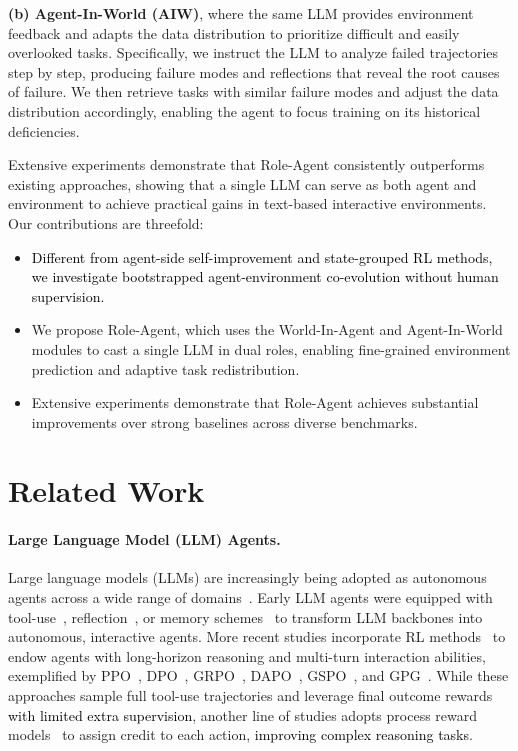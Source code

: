 \documentclass[11pt]{article}
\begin{document}
\textbf{(b) Agent-In-World (AIW)}, where the same LLM provides environment feedback and adapts the data distribution to prioritize difficult and easily overlooked tasks. Specifically, we instruct the LLM to analyze failed trajectories step by step, producing failure modes and reflections that reveal the root causes of failure. We then retrieve tasks with similar failure modes and adjust the data distribution accordingly, enabling the agent to focus training on its historical deficiencies.


Extensive experiments demonstrate that Role-Agent consistently outperforms existing approaches, showing that a single LLM can serve as both agent and environment to achieve practical gains in text-based interactive environments. Our contributions are threefold:

\begin{itemize}
    \item \textcolor{black}{Different from agent-side self-improvement and state-grouped RL methods, we investigate bootstrapped agent-environment co-evolution without human supervision.}
    \vspace{-0.1cm}
    \item We propose Role-Agent, which uses the World-In-Agent and Agent-In-World modules to cast a single LLM in dual roles, enabling fine-grained environment prediction and adaptive task redistribution.
    \vspace{-0.1cm} 
    \item Extensive experiments demonstrate that Role-Agent achieves substantial improvements over strong baselines across diverse benchmarks.
\end{itemize}


\section{Related Work}
\paragraph{Large Language Model (LLM) Agents.} Large language models (LLMs) are increasingly being adopted as autonomous agents across a wide range of domains~\cite{wang2023voyager,wang2024mobile,jiang2025aide,ou2025automind}. Early LLM agents were equipped with tool-use~\cite{yao2022react}, reflection~\cite{shinn2023reflexion}, or memory schemes~\cite{xu2025mem,fang2025memp,zhang2026memskill} to transform LLM backbones into autonomous, interactive agents. More recent studies incorporate RL methods~\cite{lambert2024tulu} to endow agents with long-horizon reasoning and multi-turn interaction abilities, exemplified by PPO~\cite{schulman2017proximal}, DPO~\cite{rafailov2023direct}, GRPO~\cite{guo2025deepseek}, DAPO~\cite{yu2025dapo}, GSPO~\cite{zheng2025group}, and GPG~\cite{chu2025gpg}. While these approaches sample full tool-use trajectories and leverage final outcome rewards \textcolor{black}{with limited extra supervision}, another line of studies adopts process reward models~\cite{shao2024deepseekmath,zhang2025process,wang2025stepsearch} to assign credit to each action, \textcolor{black}{improving complex reasoning tasks}.
\end{document}

